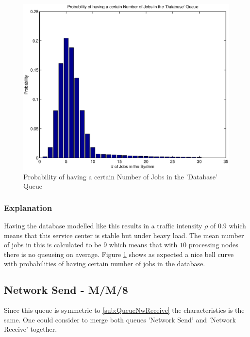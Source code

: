 \documentclass[a4paper]{article}
\begin{document}

\begin{figure}[H]
	\begin{center}
    \includegraphics[scale=0.6]{../plots-ms2-mg/queueanalysis-3Db.eps}
  \end{center}
  \caption{Probability of having a certain Number of Jobs in the 'Database' Queue}
  \label{fig:queueanalysis3}
\end{figure}


\subsubsection{Explanation}
Having the database modelled like this results in a traffic intensity $\rho$ of $0.9$ which means that this service center is stable but under heavy load. The mean number of jobs in this is calculated to be $9$ which means that with $10$ processing nodes there is no queueing on average. Figure \ref{fig:queueanalysis3} shows as expected a nice bell curve with probabilities of having certain number of jobs in the database.


\subsection{Network Send - M/M/8}
Since this queue is symmetric to \ref{sub:QueueNwReceive} the characteristics is the same. One could consider to merge both queues 'Network Send' and 'Network Receive' together.
\end{document}
